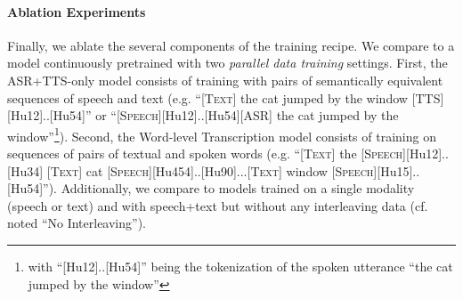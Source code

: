 \paragraph{Ablation Experiments} Finally, we ablate the several components of the \spot training recipe. We compare \spotbase to a \llamatwo model continuously pretrained with two \textit{parallel data training} settings. First, the ASR+TTS-only model consists of training with pairs of semantically equivalent sequences of speech and text (e.g. ``\textsc{[Text]} the cat jumped by the window \textsc{[TTS]}[Hu12]..[Hu54]'' or ``\textsc{[Speech]}[Hu12]..[Hu54]\textsc{[ASR]} the cat jumped by the window''\footnote{with ``[Hu12]..[Hu54]'' being the tokenization of the spoken utterance ``the cat jumped by the window''}). Second, the Word-level Transcription model consists of training on sequences of pairs of textual and spoken words (e.g. ``\textsc{[Text]} the \textsc{[Speech]}[Hu12]..[Hu34] \textsc{[Text]} cat \textsc{[Speech]}[Hu454]..[Hu90]...\textsc{[Text]} window \textsc{[Speech]}[Hu15]..[Hu54]''). Additionally, we compare \spotbase to models trained on a single modality (speech or text) and with speech+text but without any interleaving data (cf. noted ``No Interleaving''). %

